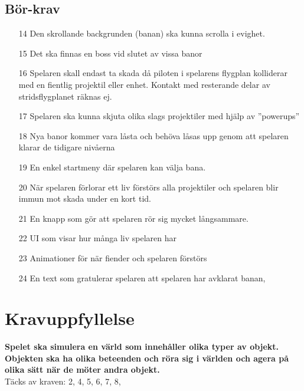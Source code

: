 \documentclass{TDP005mall}
\begin{document}
\subsection{Bör-krav}
\begin{enumerate}
  \setcounter{enumi}{13}
  \item [14] Den skrollande backgrunden (banan) ska kunna scrolla i evighet.
  \item [15] Det ska finnas en boss vid slutet av vissa banor
  \item [16] Spelaren skall endast ta skada då piloten i spelarens flygplan kolliderar med en fientlig projektil eller enhet. Kontakt med resterande delar av stridsflygplanet räknas ej. 
  \item [17] Spelaren ska kunna skjuta olika slags projektiler med hjälp av ''powerups''
  \item [18] Nya banor kommer vara låsta och behöva låsas upp genom att spelaren klarar de tidigare nivåerna 
  \item [19] En enkel startmeny där spelaren kan välja bana.
  \item [20] När spelaren förlorar ett liv förstörs alla projektiler och spelaren blir immun mot skada under en kort tid.
  \item [21] En knapp som gör att spelaren rör sig mycket långsammare.
  \item [22] UI som visar hur många liv spelaren har
  \item [23] Animationer för när fiender och spelaren förstörs
  \item [24] En text som gratulerar spelaren att spelaren har avklarat banan,
\end{enumerate}
\section{Kravuppfyllelse}
\textbf{Spelet ska simulera en värld som innehåller olika typer av objekt. Objekten ska ha olika beteenden och röra sig i världen och agera på olika sätt när de möter andra objekt.}
\\
Täcks av kraven: 2, 4, 5, 6, 7, 8,
\end{document}
